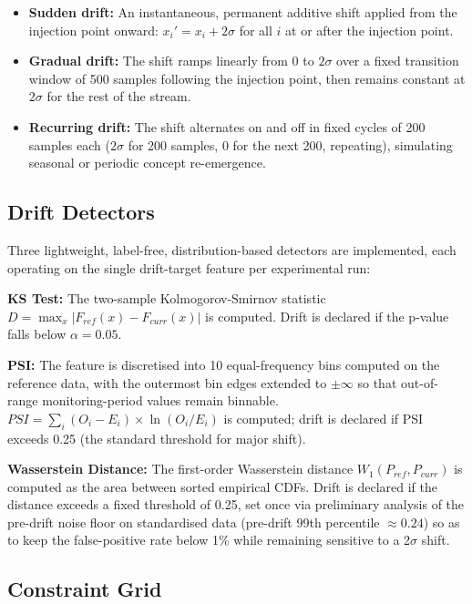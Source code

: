 \documentclass[conference]{IEEEtran}
\begin{document}
\begin{itemize}
\item \textbf{Sudden drift:} An instantaneous, permanent additive shift applied from the injection point onward: $x_i' = x_i + 2\sigma$ for all $i$ at or after the injection point.
\item \textbf{Gradual drift:} The shift ramps linearly from 0 to $2\sigma$ over a fixed transition window of 500 samples following the injection point, then remains constant at $2\sigma$ for the rest of the stream.
\item \textbf{Recurring drift:} The shift alternates on and off in fixed cycles of 200 samples each ($2\sigma$ for 200 samples, 0 for the next 200, repeating), simulating seasonal or periodic concept re-emergence.
\end{itemize}

\subsection{Drift Detectors}

Three lightweight, label-free, distribution-based detectors are implemented, each operating on the single drift-target feature per experimental run:

\textbf{KS Test:} The two-sample Kolmogorov-Smirnov statistic $D = \max_x |F_{ref}(x) - F_{curr}(x)|$ is computed. Drift is declared if the p-value falls below $\alpha = 0.05$.

\textbf{PSI:} The feature is discretised into 10 equal-frequency bins computed on the reference data, with the outermost bin edges extended to $\pm\infty$ so that out-of-range monitoring-period values remain binnable. $PSI = \sum_i (O_i - E_i) \times \ln(O_i / E_i)$ is computed; drift is declared if PSI exceeds 0.25 (the standard threshold for major shift).

\textbf{Wasserstein Distance:} The first-order Wasserstein distance $W_1(P_{ref}, P_{curr})$ is computed as the area between sorted empirical CDFs. Drift is declared if the distance exceeds a fixed threshold of 0.25, set once via preliminary analysis of the pre-drift noise floor on standardised data (pre-drift 99th percentile $\approx 0.24$) so as to keep the false-positive rate below 1\% while remaining sensitive to a 2$\sigma$ shift.

\subsection{Constraint Grid}
\end{document}
